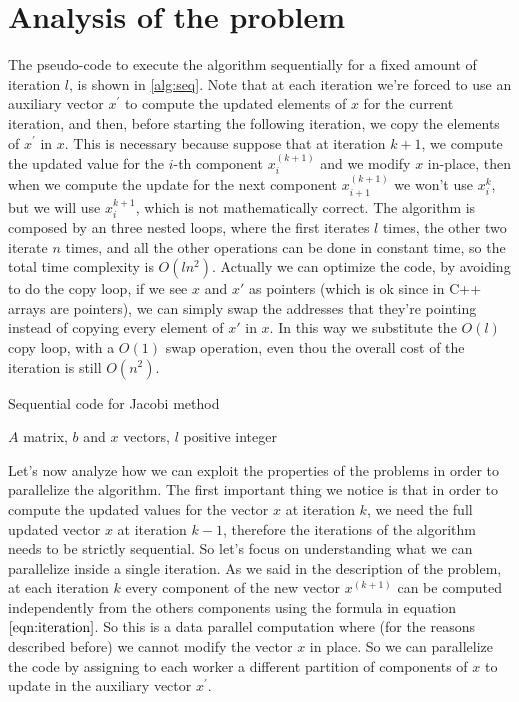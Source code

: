 \documentclass[12pt]{article}
\begin{document}
	\section{Analysis of the problem}
	The pseudo-code to execute the algorithm sequentially for a fixed amount of iteration $l$, is shown in \ref{alg:seq}. Note that at each iteration we're forced to use an auxiliary vector $x^\prime$ to compute the updated elements of $x$ for the current iteration, and then, before starting the following iteration, we copy the elements of $x^\prime$ in $x$. This is necessary because suppose that at iteration $k+1$, we compute the updated value for the $i$-th component $x^{(k+1)}_i$ and we modify $x$ in-place, then when we compute the update for the next component $x^{(k+1)}_{i+1}$ we won't use $x^{k}_i$, but we will use $x^{k+1}_i$, which is not mathematically correct. The algorithm is composed by an three nested loops, where the first iterates $l$ times, the other two iterate $n$ times, and all the other operations can be done in constant time, so the total time complexity is $O(ln^2)$. Actually we can optimize the code, by avoiding to do the copy loop, if we see $x$ and $x\prime$ as pointers (which is ok since in C++ arrays are pointers), we can simply swap the addresses that they're pointing instead of copying every element of $x\prime$ in $x$. In this way we substitute the $O(l)$ copy loop, with a $O(1)$ swap operation, even thou the overall cost of the iteration is still $O(n^2)$.
	\begin{algorithm}[H]
		\caption{Sequential code for Jacobi method}\label{alg:seq}
		\begin{algorithmic}
			\Require $A$ matrix, $b$ and $x$ vectors, $l$ positive integer
			\EndFor
			\EndFor
			\EndFor
			\EndFor
		\end{algorithmic}
	\end{algorithm}
	Let's now analyze how we can exploit the properties of the problems in order to parallelize the algorithm. The first important thing we notice is that in order to compute the updated values for the vector $x$ at iteration $k$, we need the full updated vector $x$ at iteration $k-1$, therefore the iterations of the algorithm needs to be strictly sequential. So let's focus on understanding what we can parallelize inside a single iteration. As we said in the description of the problem, at each iteration $k$ every component of the new vector $x^{(k+1)}$ can be computed independently from the others components using the formula in equation $\ref{eqn:iteration}$. So this is a data parallel computation where (for the reasons described before) we cannot modify the vector $x$ in place. So we can parallelize the code by assigning to each worker a different partition of components of $x$ to update in the auxiliary vector $x^\prime$.\\
\end{document}

